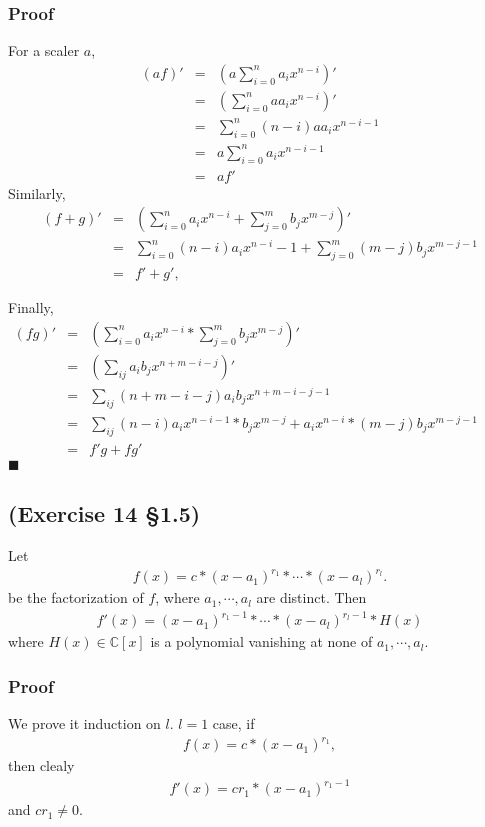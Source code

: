 \documentclass[11pt]{book}
\begin{document}
\subsubsection{Proof}
For a scaler $a$,
\begin{eqnarray}
(af)' &=& \left( a\sum_{i=0}^n a_i x^{n-i} \right)' \\
&=& \left( \sum_{i=0}^n aa_i x^{n-i} \right)' \\
&=& \sum_{i=0}^n (n-i)aa_i x^{n-i-1} \\
&=& a\sum_{i=0}^n a_i x^{n-i-1} \\
&=& af'
\end{eqnarray}
Similarly,
\begin{eqnarray}
(f+g)' &=& \left( \sum_{i=0}^n a_i x^{n-i}  + \sum_{j=0}^m b_j x^{m-j} \right)' \\
&=& \sum_{i=0}^n (n-i) a_i x^{n-i}-1  + \sum_{j=0}^m (m-j) b_j x^{m-j-1} \\
&=& f' + g',
\end{eqnarray}

Finally,
\begin{eqnarray}
(fg)' &=& \left( \sum_{i=0}^n a_i x^{n-i}  * \sum_{j=0}^m b_j x^{m-j} \right)' \\
&=& \left( \sum_{ij} a_i  b_j x^{n+m-i-j} \right)' \\
&=& \sum_{ij} (n+m-i-j)a_i  b_j x^{n+m-i-j-1} \\
&=& \sum_{ij} (n-i)a_i  x^{n-i-1} * b_j x^{m-j} + a_i x^{n-i} * (m-j) b_j x^{m-j-1} \qquad \qquad \\
&=& f'g + fg'
\end{eqnarray}
$\blacksquare$

\subsection{(Exercise 14 \S1.5)}
Let
\begin{eqnarray}
f(x) = c * (x -a_1)^{r_1} *\cdots * (x-a_l)^{r_l}.
\end{eqnarray}
be the factorization of $f$, where $a_1,\cdots, a_l$ are distinct.
Then
\begin{eqnarray}
f'(x) = (x -a_1)^{r_1-1} *\cdots * (x-a_l)^{r_l-1} * H(x)
\end{eqnarray}
where $H(x) \in \mathbb{C}[x]$ is a polynomial vanishing at none of $a_1,\cdots, a_l$.

\subsubsection{Proof}
We prove it induction on $l$.
$l=1$ case, if
\begin{eqnarray}
f(x) = c * (x -a_1)^{r_1},
\end{eqnarray}
then clealy\begin{eqnarray}
f'(x) = cr_1 * (x-a_1)^{r_1-1}
\end{eqnarray}
and $cr_1 \neq 0$.
\end{document}
